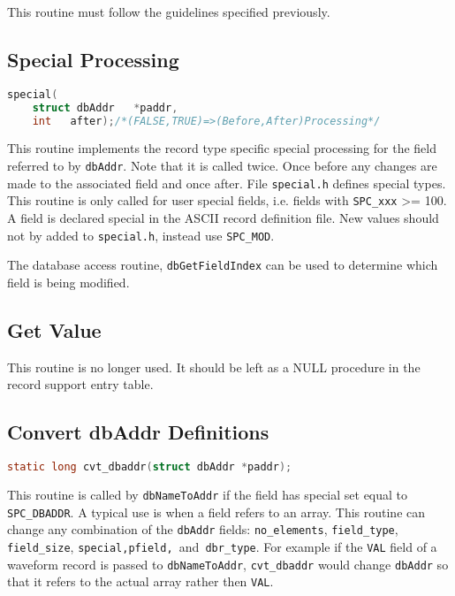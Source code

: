 This routine must follow the guidelines specified previously.

\subsection{Special Processing}

\begin{lstlisting}[language=C]
special(
    struct dbAddr   *paddr,
    int   after);/*(FALSE,TRUE)=>(Before,After)Processing*/
\end{lstlisting}

This routine implements the record type specific special processing for the field referred to by \verb|dbAddr|.
Note that it is called twice.
Once before any changes are made to the associated field and once after.
File \verb|special.h| defines special types.
This routine is only called for user special fields, i.e. fields with \verb|SPC_xxx| \textgreater{}= 100.
A field is declared special in the ASCII record definition file.
New values should not by added to \verb|special.h|, instead use \verb|SPC_MOD|.

The database access routine, \verb|dbGetFieldIndex| can be used to determine which field is being modified.

\subsection{Get Value}

This routine is no longer used.
It should be left as a NULL procedure in the record support entry table.

\subsection{Convert dbAddr Definitions}

\begin{lstlisting}[language=C]
static long cvt_dbaddr(struct dbAddr *paddr);
\end{lstlisting}

This routine is called by \verb|dbNameToAddr| if the field has special set equal to \verb|SPC_DBADDR|.
A typical use is when a field refers to an array.
This routine can change any combination of the \verb|dbAddr| fields:
\verb|no_elements|, \verb|field_type|, \verb|field_size|, \verb|special,pfield, |and\verb| dbr_type|.
For example if the \verb|VAL| field of a waveform record is passed to \verb|dbNameToAddr|, \verb|cvt_dbaddr| would change \verb|dbAddr| so that it refers to the actual array rather then \verb|VAL|.

